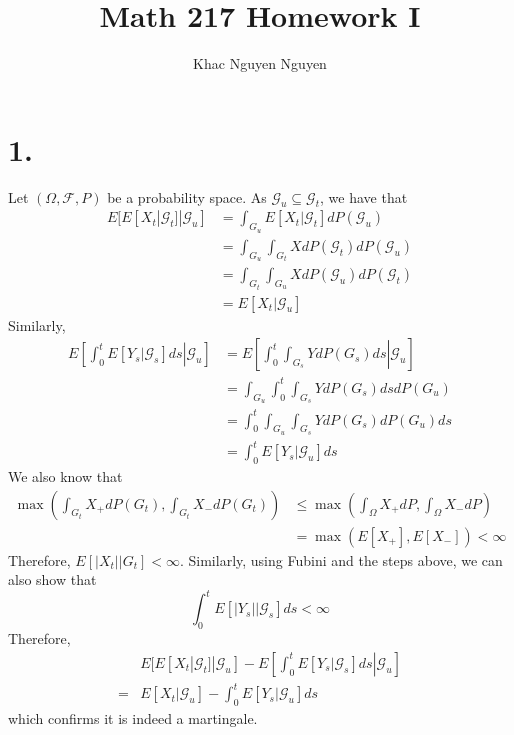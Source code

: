 \documentclass[11pt]{article}
\title{\textbf{Math 217 Homework I}}
\author{Khac Nguyen Nguyen}
\date{}
\begin{document}
\section*{1.}
Let $(\Omega, \mathcal{F}, P)$ be a probability space. As $\mathcal{G}_u \subseteq \mathcal{G}_t$, we have that 
\begin{equation*}
    \begin{aligned}
        E[E[X_t | \mathcal{G}_t] | \mathcal{G}_u] 
        &= \int_{G_u} E[X_t | \mathcal{G}_t] dP(\mathcal{G}_u)\\
        &= \int_{G_u} \int_{G_t} X dP(\mathcal{G}_t) dP(\mathcal{G}_u) \\
        &= \int_{G_t} \int_{G_u} X dP(\mathcal{G}_u) dP(\mathcal{G}_t) \\
        &= E[X_t | \mathcal{G}_u]
    \end{aligned}
\end{equation*}
Similarly, 
\begin{equation*}
    \begin{aligned}
        E\left[ \left. \int_0^t E\left[ \left. Y_s \right|\mathcal{G}_s \right] ds\right| \mathcal{G}_u \right]        
        &= E\left[ \left. \int_0^t \int_{G_s} Y dP(G_s) ds\right| \mathcal{G}_u \right] \\
        &= \int_{G_u} \int_0^t \int_{G_s} Y dP(G_s) ds dP(G_u) \\
        &= \int_0^t \int_{G_u} \int_{G_s} Y dP(G_s) dP(G_u) ds \\
        &= \int_0^t E[Y_s | \mathcal{G}_u] ds
    \end{aligned}
\end{equation*}
We also know that 
\begin{equation*}
    \begin{aligned}
        \max \left( \int_{G_t} X_+ dP(G_t), \int_{G_t} X_- dP(G_t) \right) 
        &\le \max \left( \int_\Omega X_+ dP, \int_\Omega X_- dP \right) \\
        &= \max(E[X_+], E[X_-]) < \infty
    \end{aligned}
\end{equation*}
Therefore, $E[|X_t|| G_t] < \infty$. Similarly, using Fubini and the steps above, 
we can also show that 
\[
    \int_0^t E[|Y_s| | \mathcal{G}_s] ds < \infty    
\]
Therefore, 
\begin{equation*}
    \begin{aligned}
        & E[E[X_t | \mathcal{G}_t] | \mathcal{G}_u] -  E\left[ \left. \int_0^t E\left[ \left. Y_s \right|\mathcal{G}_s \right] ds\right| \mathcal{G}_u \right] \\
        =& E[X_t | \mathcal{G}_u] - \int_0^t E[Y_s | \mathcal{G}_u] ds
    \end{aligned}
\end{equation*}
which confirms it is indeed a martingale.
\newpage
\end{document}

